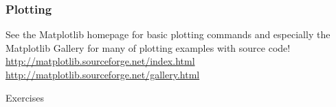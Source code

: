 \begin{frame}
\frametitle{Plotting}
See the Matplotlib homepage for basic plotting commands and especially the
Matplotlib Gallery for many of plotting examples with source code!\\
\href{http://matplotlib.sourceforge.net/index.html}{http://matplotlib.sourceforge.net/index.html}
\href{http://matplotlib.sourceforge.net/gallery.html}{http://matplotlib.sourceforge.net/gallery.html}
\end{frame}

\begin{frame}
\begin{center}
\Huge{Exercises}
\end{center}
\end{frame}

